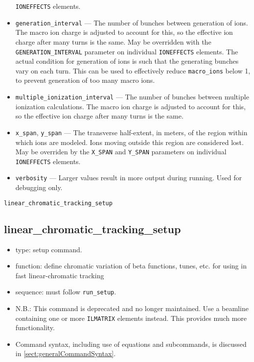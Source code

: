 \documentclass[11pt]{article}
\begin{document}
\begin{itemize}
  \verb|IONEFFECTS| elements.
\item \verb|generation_interval| --- The number of bunches between generation of ions. The macro ion charge is adjusted
  to account for this, so the effective ion charge after many turns is the same. May be overridden with the
  \verb|GENERATION_INTERVAL| parameter on individual \verb|IONEFFECTS| elements. The actual condition for generation of
  ions is such that the generating bunches vary on each turn. This can be used to effectively reduce \verb|macro_ions|
  below 1, to prevent generation of too many macro ions.
\item \verb|multiple_ionization_interval| --- The number of bunches between multiple ionization calculations.  The macro ion charge is adjusted
  to account for this, so the effective ion charge after many turns is the same.
\item \verb|x_span|, \verb|y_span| --- The transverse half-extent, in meters, of the region within which ions are modeled.
  Ions moving outside this region are considered lost. May be overriden by the \verb|X_SPAN| and \verb|Y_SPAN| parameters
  on individual \verb|IONEFFECTS| elements.
\item \verb|verbosity| --- Larger values result in more output during running. Used for debugging only.
\end{itemize}

\newpage
\begin{center}{\Large\verb|linear_chromatic_tracking_setup|}\end{center}
\subsection{linear\_chromatic\_tracking\_setup \label{subsec:linearchromatictrackingsetup}}

\begin{itemize}
\item type: setup command.
\item function: define chromatic variation of beta functions, tunes, etc. for using in
 fast linear-chromatic tracking
\item sequence: must follow \verb|run_setup|.
\item N.B.: This command is deprecated and no longer maintained. Use a beamline containing one or
  more \verb|ILMATRIX| elements instead. This provides much more functionality.
\item Command syntax, including use of equations and subcommands, is discussed in \ref{sect:generalCommandSyntax}.
\end{itemize}
\end{document}
